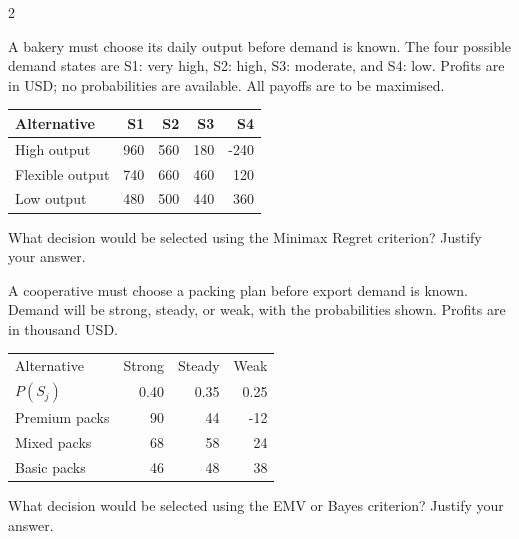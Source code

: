 \begin{multicols}{2}
\begin{minipage}{\linewidth}
A bakery must choose its daily output before demand is known. The four possible demand states are S1: very high, S2: high, S3: moderate, and S4: low. Profits are in USD; no probabilities are available. All payoffs are to be maximised.
\begin{center}\small\setlength{\tabcolsep}{4pt}
\begin{tabular}{@{}lrrrr@{}}\toprule
Alternative&S1&S2&S3&S4\\\midrule
High output&960&560&180&-240\\
Flexible output&740&660&460&120\\
Low output&480&500&440&360\\\bottomrule
\end{tabular}\end{center}

What decision would be selected using the Minimax Regret criterion? Justify your answer. 
\end{minipage}\par

\begin{minipage}{\linewidth}
A cooperative must choose a packing plan before export demand is known. Demand will be strong, steady, or weak, with the probabilities shown. Profits are in thousand USD.
\begin{center}\small\setlength{\tabcolsep}{4pt}
\begin{tabular}{@{}lrrr@{}}\toprule
Alternative&Strong&Steady&Weak\\
$P(S_j)$&0.40&0.35&0.25\\\midrule
Premium packs&90&44&-12\\
Mixed packs&68&58&24\\
Basic packs&46&48&38\\\bottomrule
\end{tabular}\end{center}

What decision would be selected using the EMV or Bayes criterion? Justify your answer. 
\end{minipage}\par


\end{multicols}
